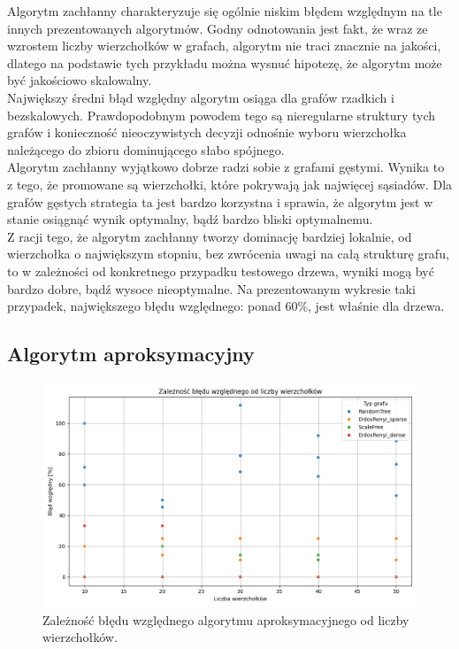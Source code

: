 Algorytm zachłanny charakteryzuje się ogólnie niskim błędem względnym na tle innych prezentowanych algorytmów. Godny odnotowania jest fakt, że wraz ze wzrostem liczby wierzchołków w grafach, algorytm nie traci znacznie na jakości, dlatego na podstawie tych przykładu można wysnuć hipotezę, że algorytm może być jakościowo skalowalny.\\
Największy średni błąd względny algorytm osiąga dla grafów rzadkich i bezskalowych. Prawdopodobnym powodem tego są nieregularne struktury tych grafów i konieczność nieoczywistych decyzji odnośnie wyboru wierzchołka należącego do zbioru dominującego słabo spójnego.\\
Algorytm zachłanny wyjątkowo dobrze radzi sobie z grafami gęstymi. Wynika to z tego, że promowane są wierzchołki, które pokrywają jak najwięcej sąsiadów. Dla grafów gęstych strategia ta jest bardzo korzystna i sprawia, że algorytm jest w stanie osiągnąć wynik optymalny, bądź bardzo bliski optymalnemu.\\
Z racji tego, że algorytm zachłanny tworzy dominację bardziej lokalnie, od wierzchołka o największym stopniu, bez zwrócenia uwagi na całą strukturę grafu, to w zależności od konkretnego przypadku testowego drzewa, wyniki mogą być bardzo dobre, bądź wysoce nieoptymalne. Na prezentowanym wykresie taki przypadek, największego błędu względnego: ponad 60\%, jest właśnie dla drzewa.  

\subsection{Algorytm aproksymacyjny}

\begin{figure}[H]
    \centering
    \includegraphics[width=\textwidth]{assets/plots_approx/approx.png}
    \caption{Zależność błędu względnego algorytmu aproksymacyjnego od liczby wierzchołków.}
    \label{fig:approxPlot}
\end{figure}

